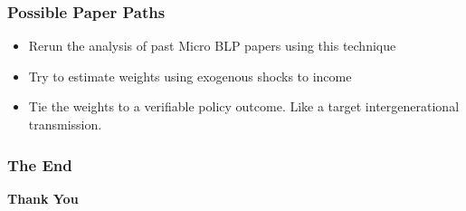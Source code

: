 \documentclass{beamer}
\begin{document}
\begin{frame}
\frametitle{Possible Paper Paths}

\begin{itemize}
		\setlength{\itemsep}{5mm}
\item Rerun the analysis of past Micro BLP papers using this technique 

\item Try to estimate weights using exogenous shocks to income

\item Tie the weights to a verifiable policy outcome. Like a target intergenerational transmission. 
\end{itemize}
\end{frame}



\begin{frame}

\frametitle{The End }

\begin{center}
	
\begin{Huge}
\textbf{Thank You}
\end{Huge}
\end{center}
\end{frame}

\end{document}
